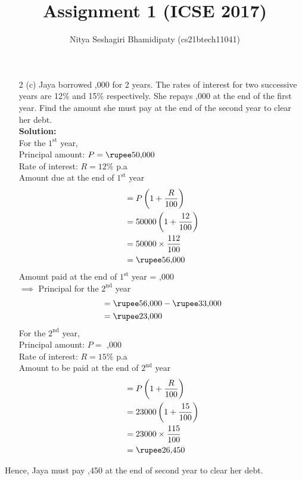 \documentclass[journal,12pt,two column]{IEEEtran}
\title{Assignment 1 (ICSE 2017)}
\author{Nitya Seshagiri Bhamidipaty (cs21btech11041)}
\newcommand{\solution}{\noindent \textbf{Solution: }}
\begin{document}
\maketitle
\begin{enumerate}
\item[2 (c)] Jaya borrowed ,000 for 2 years. The rates of interest for two successive years are 12\% and 15\% respectively. She repays ,000 at the end of the first year. Find the amount she must pay at the end of the second year to clear her debt.\\
    \solution \\
For the $1^{\text{st}}$ year, \\
Principal amount: $P = \text{\rupee50,000}$\\
Rate of interest: $R = 12\%$ p.a \\
Amount due at the end of $1^{\text{st}}$ year 
\begin{align*}
    &= P\left(1 + \frac{R}{100}\right)
    \\
    &= 50000\left(1 + \frac{12}{100}\right)
    \\
    &= 50000\times \frac{112}{100}
    \\
    &= \text{\rupee56,000}
\end{align*}
Amount paid at the end of $1^{\text{st}}$ year = ,000\\
$\implies$ Principal for the $2^{\text{nd}}$ year
\begin{align*}
    &= \text{\rupee56,000} - \text{\rupee33,000}
    \\
    &= \text{\rupee23,000}
\end{align*}
For the $2^{\text{nd}}$ year,\\
Principal amount: $P =$ ,000\\
Rate of interest: $R = 15\%$ p.a \\
Amount to be paid at the end of $2^{\text{nd}}$ year
\begin{align*}
    &= P\left(1 + \frac{R}{100}\right)
    \\
    &= 23000\left(1 + \frac{15}{100}\right)
    \\
    &= 23000\times \frac{115}{100}
    \\
    &= \text{\rupee26,450}
\end{align*}
\end{enumerate}
Hence, Jaya must pay ,450 at the end of second year to clear her debt.
\end{document}
